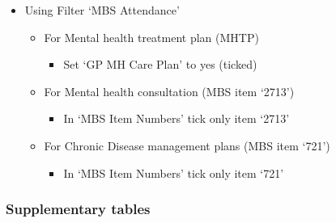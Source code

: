 \documentclass[
  letterpaper,
  DIV=11,
  numbers=noendperiod,
  oneside]{scrartcl}
\providecommand{\tightlist}{%
  \setlength{\itemsep}{0pt}\setlength{\parskip}{0pt}}\usepackage{longtable,booktabs,array}
\begin{document}
\begin{itemize}
\tightlist
\item
  Using Filter `MBS Attendance'

  \begin{itemize}
  \tightlist
  \item
    For Mental health treatment plan (MHTP)

    \begin{itemize}
    \tightlist
    \item
      Set `GP MH Care Plan' to yes (ticked)
    \end{itemize}
  \item
    For Mental health consultation (MBS item `2713')

    \begin{itemize}
    \tightlist
    \item
      In `MBS Item Numbers' tick only item `2713'
    \end{itemize}
  \item
    For Chronic Disease management plans (MBS item `721')

    \begin{itemize}
    \tightlist
    \item
      In `MBS Item Numbers' tick only item `721'
    \end{itemize}
  \end{itemize}
\end{itemize}

\subsubsection{Supplementary tables}\label{supplementary-tables}
\end{document}
